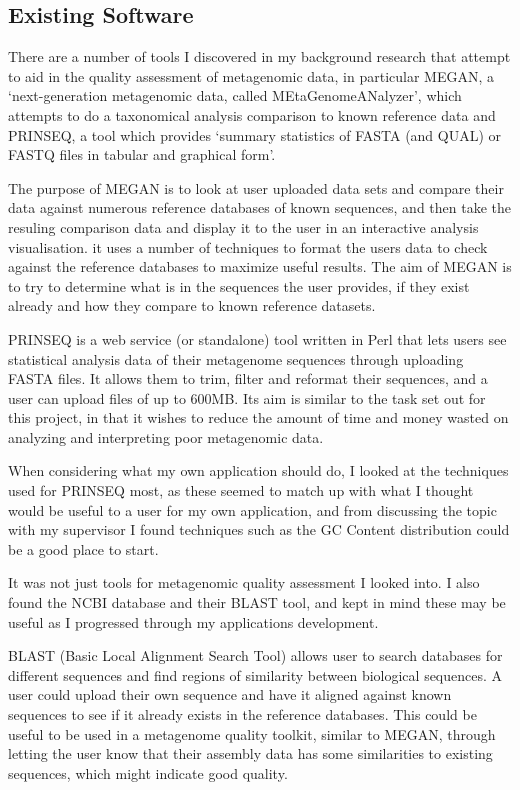 \subsection{Existing Software}
There are a number of tools I discovered in my background research that attempt to aid in the quality assessment of metagenomic data, in particular MEGAN, a `next-generation metagenomic data, called MEtaGenomeANalyzer', which attempts to do a taxonomical analysis comparison to known reference data\cite{citeulike:10457549} and PRINSEQ, a tool which provides `summary statistics of FASTA (and QUAL) or FASTQ files in tabular and graphical form'\cite{citeulike:8714996}.

The purpose of MEGAN is to look at user uploaded data sets and compare their data against numerous reference databases of known sequences, and then take the resuling comparison data and display it to the user in an interactive analysis visualisation. it uses a number of techniques to format the users data to check against the reference databases to maximize useful results. The aim of MEGAN is to try to determine what is in the sequences the user provides, if they exist already and how they compare to known reference datasets.

PRINSEQ is a web service (or standalone) tool written in Perl that lets users see statistical analysis data of their metagenome sequences through uploading FASTA files. It allows them to trim, filter and reformat their sequences, and a user can upload files of up to 600MB. Its aim is similar to the task set out for this project, in that it wishes to reduce the amount of time and money wasted on analyzing and interpreting poor metagenomic data.

When considering what my own application should do, I looked at the techniques used for PRINSEQ most, as these seemed to match up with what I thought would be useful to a user for my own application, and from discussing the topic with my supervisor I found techniques such as the GC Content distribution could be a good place to start.

It was not just tools for metagenomic quality assessment I looked into. I also found the NCBI database and their BLAST tool\cite{citeulike:11826724}, and kept in mind these may be useful as I progressed through my applications development.

BLAST (Basic Local Alignment Search Tool) allows user to search databases for different sequences and find regions of similarity between biological sequences. A user could upload their own sequence and have it aligned against known sequences to see if it already exists in the reference databases. This could be useful to be used in a metagenome quality toolkit, similar to MEGAN, through letting the user know that their assembly data has some similarities to existing sequences, which might indicate good quality.

